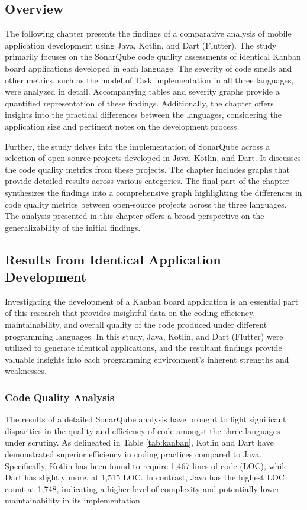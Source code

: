 \subsection{Overview}
The following chapter presents the findings of a comparative analysis of mobile application development using Java, Kotlin, and Dart (Flutter). The study primarily focuses on the SonarQube code quality assessments of identical Kanban board applications developed in each language. The severity of code smells and other metrics, such as the model of Task implementation in all three languages, were analyzed in detail. Accompanying tables and severity graphs provide a quantified representation of these findings. Additionally, the chapter offers insights into the practical differences between the languages, considering the application size and pertinent notes on the development process.
\par
Further, the study delves into the implementation of SonarQube across a selection of open-source projects developed in Java, Kotlin, and Dart. It discusses the code quality metrics from these projects. The chapter includes graphs that provide detailed results across various categories. The final part of the chapter synthesizes the findings into a comprehensive graph highlighting the differences in code quality metrics between open-source projects across the three languages. The analysis presented in this chapter offers a broad perspective on the generalizability of the initial findings.

\subsection{Results from Identical Application Development}
Investigating the development of a Kanban board application is an essential part of this research that provides insightful data on the coding efficiency, maintainability, and overall quality of the code produced under different programming languages. In this study, Java, Kotlin, and Dart (Flutter) were utilized to generate identical applications, and the resultant findings provide valuable insights into each programming environment's inherent strengths and weaknesses. 
\subsubsection{Code Quality Analysis}
The results of a detailed SonarQube analysis have brought to light significant disparities in the quality and efficiency of code amongst the three languages under scrutiny. As delineated in Table \ref*{tab:kanban}, Kotlin and Dart have demonstrated superior efficiency in coding practices compared to Java. Specifically, Kotlin has been found to require 1,467 lines of code (LOC), while Dart has slightly more, at 1,515 LOC. In contrast, Java has the highest LOC count at 1,748, indicating a higher level of complexity and potentially lower maintainability in its implementation.


